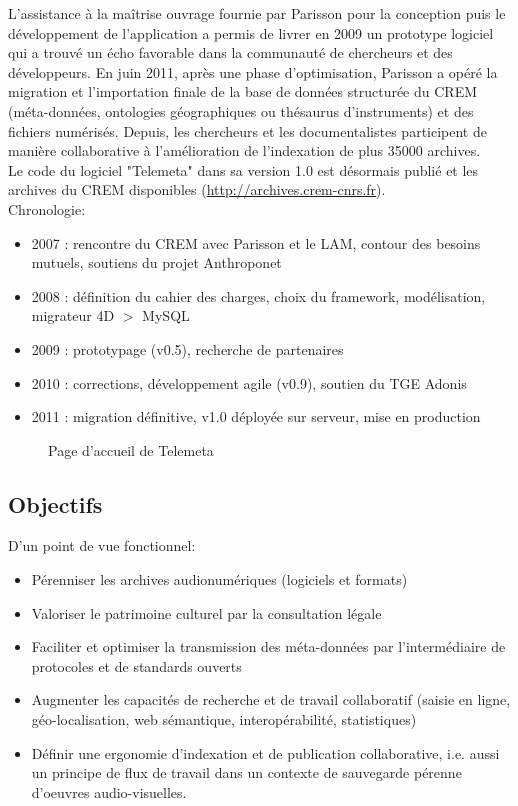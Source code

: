 \documentclass[a4paper,11pt,french]{article}
\begin{document}
L'assistance à la maîtrise ouvrage fournie par Parisson pour la conception puis le développement de l'application a permis de livrer en 2009 un prototype logiciel qui a trouvé un écho favorable dans la communauté de chercheurs et des développeurs. En juin 2011, après une phase d'optimisation, Parisson a opéré la migration et l'importation finale de la base de données structurée du CREM (méta-données, ontologies géographiques ou thésaurus d'instruments) et des fichiers numérisés. Depuis, les chercheurs et les documentalistes participent de manière collaborative à l'amélioration de l'indexation de plus 35000 archives.\\

Le code du logiciel "Telemeta" dans sa version 1.0 est désormais publié et les archives du CREM disponibles (\url{http://archives.crem-cnrs.fr}). \\

Chronologie:

\begin{itemize}
 \item 2007 : rencontre du CREM avec Parisson et le LAM, contour des besoins mutuels,  soutiens du projet Anthroponet
 \item 2008 : définition du cahier des charges, choix du framework, modélisation, migrateur 4D $>$ MySQL
 \item 2009 : prototypage (v0.5), recherche de partenaires
 \item 2010 : corrections, développement agile (v0.9), soutien du TGE Adonis
 \item 2011 : migration définitive, v1.0 déployée sur serveur, mise en production
\end{itemize}


\begin{figure}[htp]
    \centering
    \caption{Page d'accueil de Telemeta}
    \label{index1}
\end{figure}



\subsection{Objectifs}

D'un point de vue fonctionnel:

\begin{itemize}
 \item  Pérenniser les archives audionumériques (logiciels et formats)
 \item Valoriser le patrimoine culturel par la consultation légale
 \item Faciliter et optimiser la transmission des méta-données par l'intermédiaire de protocoles et de standards ouverts
 \item Augmenter les capacités de recherche et de travail collaboratif (saisie en ligne, géo-localisation, web sémantique, interopérabilité, statistiques)
 \item Définir une ergonomie d'indexation et de publication collaborative, i.e. aussi un principe de flux de travail dans un contexte de sauvegarde pérenne d'oeuvres audio-visuelles.
\end{itemize}
\end{document}
